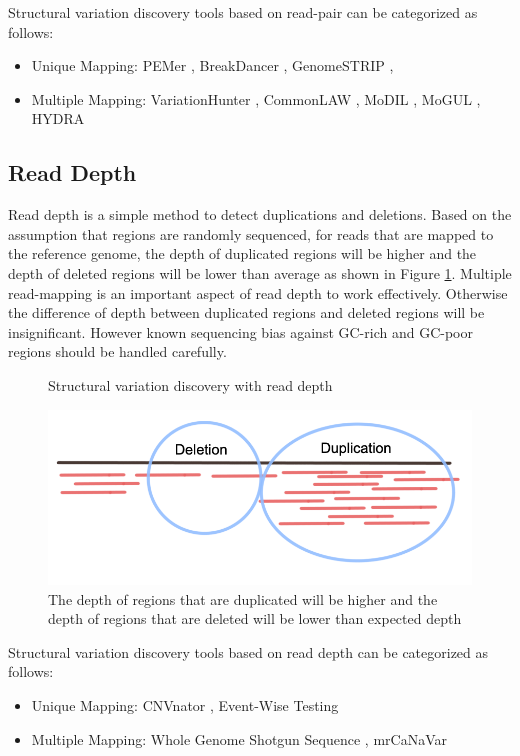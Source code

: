 Structural variation discovery tools based on read-pair can be categorized as follows:
\begin{itemize}
    \item Unique Mapping: PEMer \cite{korbel2009pemer}, BreakDancer \cite{chen2009breakdancer}, GenomeSTRIP \cite{handsaker2015large}, 
    \item Multiple Mapping: VariationHunter \cite{hormozdiari2009combinatorial}, CommonLAW \cite{hormozdiari2011simultaneous}, MoDIL \cite{lee2009modil}, MoGUL \cite{lee2010mogul}, HYDRA \cite{quinlan2010genome}
\end{itemize}
\subsection{Read Depth}
Read depth is a simple method to detect duplications and deletions. Based on the assumption that regions are randomly sequenced, for reads that are mapped to the reference genome, the depth of duplicated regions will be higher and the depth of deleted regions will be lower than average \cite{bailey2002recent} as shown in Figure \ref{readdepth}. Multiple read-mapping is an important aspect of read depth to work effectively. Otherwise the difference of depth between duplicated regions and deleted regions will be insignificant. However known sequencing bias against GC-rich and GC-poor regions \cite{smith2008rapid} should be handled carefully.

\begin{figure}[ht]
    \centering
    \caption{Structural variation discovery with read depth}
    \includegraphics[scale=0.7]{images/readdepth.png}
    \caption*{The depth of regions that are duplicated will be higher and the depth of regions that are deleted will be lower than expected depth}
    \label{readdepth}
\end{figure}

Structural variation discovery tools based on read depth can be categorized as follows:
\begin{itemize}
    \item Unique Mapping: CNVnator \cite{abyzov2011cnvnator}, Event-Wise Testing \cite{yoon2009sensitive}
    \item Multiple Mapping: Whole Genome Shotgun Sequence \cite{bailey2002recent}, mrCaNaVar \cite{alkan2009personalized}
\end{itemize}

